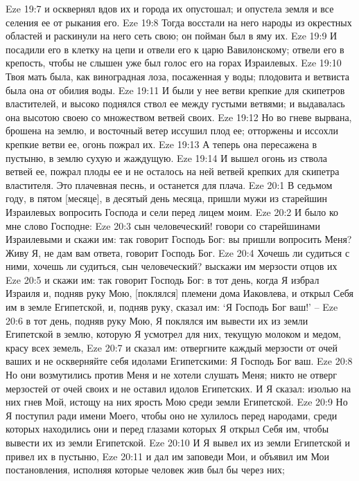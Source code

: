 Eze 19:7  и осквернял вдов их и города их опустошал; и опустела земля и все селения ее от рыкания его.
Eze 19:8  Тогда восстали на него народы из окрестных областей и раскинули на него сеть свою; он пойман был в яму их.
Eze 19:9  И посадили его в клетку на цепи и отвели его к царю Вавилонскому; отвели его в крепость, чтобы не слышен уже был голос его на горах Израилевых.
Eze 19:10  Твоя мать была, как виноградная лоза, посаженная у воды; плодовита и ветвиста была она от обилия воды.
Eze 19:11  И были у нее ветви крепкие для скипетров властителей, и высоко поднялся ствол ее между густыми ветвями; и выдавалась она высотою своею со множеством ветвей своих.
Eze 19:12  Но во гневе вырвана, брошена на землю, и восточный ветер иссушил плод ее; отторжены и иссохли крепкие ветви ее, огонь пожрал их.
Eze 19:13  А теперь она пересажена в пустыню, в землю сухую и жаждущую.
Eze 19:14  И вышел огонь из ствола ветвей ее, пожрал плоды ее и не осталось на ней ветвей крепких для скипетра властителя. Это плачевная песнь, и останется для плача.
Eze 20:1  В седьмом году, в пятом [месяце], в десятый день месяца, пришли мужи из старейшин Израилевых вопросить Господа и сели перед лицем моим.
Eze 20:2  И было ко мне слово Господне:
Eze 20:3  сын человеческий! говори со старейшинами Израилевыми и скажи им: так говорит Господь Бог: вы пришли вопросить Меня? Живу Я, не дам вам ответа, говорит Господь Бог.
Eze 20:4  Хочешь ли судиться с ними, хочешь ли судиться, сын человеческий? выскажи им мерзости отцов их
Eze 20:5  и скажи им: так говорит Господь Бог: в тот день, когда Я избрал Израиля и, подняв руку Мою, [поклялся] племени дома Иаковлева, и открыл Себя им в земле Египетской, и, подняв руку, сказал им: `Я Господь Бог ваш!' --
Eze 20:6  в тот день, подняв руку Мою, Я поклялся им вывести их из земли Египетской в землю, которую Я усмотрел для них, текущую молоком и медом, красу всех земель,
Eze 20:7  и сказал им: отвергните каждый мерзости от очей ваших и не оскверняйте себя идолами Египетскими: Я Господь Бог ваш.
Eze 20:8  Но они возмутились против Меня и не хотели слушать Меня; никто не отверг мерзостей от очей своих и не оставил идолов Египетских. И Я сказал: изолью на них гнев Мой, истощу на них ярость Мою среди земли Египетской.
Eze 20:9  Но Я поступил ради имени Моего, чтобы оно не хулилось перед народами, среди которых находились они и перед глазами которых Я открыл Себя им, чтобы вывести их из земли Египетской.
Eze 20:10  И Я вывел их из земли Египетской и привел их в пустыню,
Eze 20:11  и дал им заповеди Мои, и объявил им Мои постановления, исполняя которые человек жив был бы через них;
